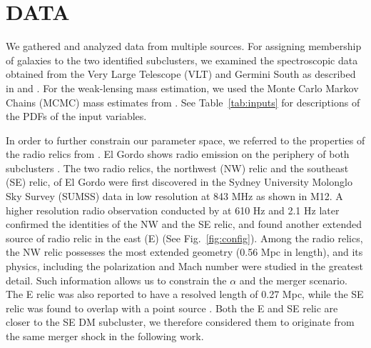 \section{DATA} 
We gathered and analyzed data from multiple sources. For assigning membership of galaxies to the two identified subclusters, we
examined the spectroscopic data obtained from the Very Large Telescope (VLT) and
Germini South as described in  and \citet{Sifon13}.
For the weak-lensing mass estimation, we used the
Monte Carlo Markov Chains (MCMC) mass estimates from .
See Table~\ref{tab:inputs} for descriptions of the PDFs of the input
variables. \par 
In order to further constrain our parameter space, we referred to the properties of
the radio relics from \citet{L13}. El Gordo shows radio emission on the
periphery of both subclusters . The two radio relics, the
northwest (NW) relic and the southeast (SE) relic, of El Gordo were first
discovered in the Sydney University Molonglo Sky Survey (SUMSS) data in low
resolution at 843 MHz \citep{Mauch03} as shown in M12. A higher
resolution radio observation conducted by \cite{L13} at 610 \mega Hz and
2.1 \giga Hz later confirmed the identities of the NW and the SE relic, and
found another extended source of radio relic in the east (E) (See Fig.~\ref{fig:config}). Among the radio relics, the NW relic possesses the most extended geometry
(0.56 Mpc in length), and its physics, including the
polarization and Mach number were studied in the greatest detail. Such
information allows us to constrain the $\alpha$ and the merger scenario. The E relic
was also reported to have a resolved length of 0.27 Mpc, while the SE relic
was found to overlap with a point source \citep{L13}. Both the E and SE
relic are closer to the SE DM subcluster, we therefore considered them to
originate from the same merger shock in the following work.

